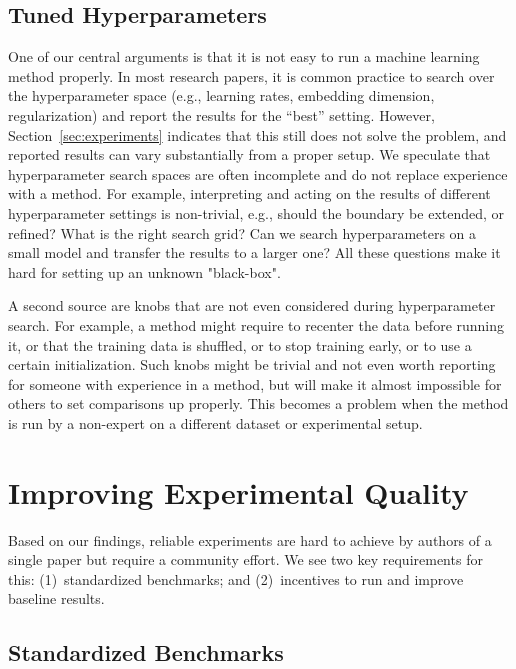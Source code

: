 \documentclass{article}
\begin{document}
\subsection{Tuned Hyperparameters}

One of our central arguments is that it is not easy to run a machine learning method properly.
In most research papers, it is common practice to search over the hyperparameter space (e.g., learning rates, embedding dimension, regularization) and report the results for the ``best'' setting.
However, Section~\ref{sec:experiments} indicates that this still does not solve the problem, and reported results can vary substantially from a proper setup.
We speculate that hyperparameter search spaces are often incomplete and do not replace experience with a method.
For example, interpreting and acting on the results of different hyperparameter settings is non-trivial, e.g., should the boundary be extended, or refined? What is the right search grid?
Can we search hyperparameters on a small model and transfer the results to a larger one?
All these questions make it hard for setting up an unknown "black-box".

A second source are knobs that are not even considered during hyperparameter search.
For example, a method might require to recenter the data before running it, or that the training data is shuffled, or to stop training early, or to use a certain initialization.
Such knobs might be trivial and not even worth reporting for someone with experience in a method, but will make it almost impossible for others to set comparisons up properly.
This becomes a problem when the method is run by a non-expert on a different dataset or experimental setup.





\section{Improving Experimental Quality}

Based on our findings, reliable experiments are hard to achieve by authors of a single paper but require a community effort.
We see two key requirements for this: (1)~standardized benchmarks; and (2)~incentives to run and improve baseline results.

\subsection{Standardized Benchmarks}
\end{document}
